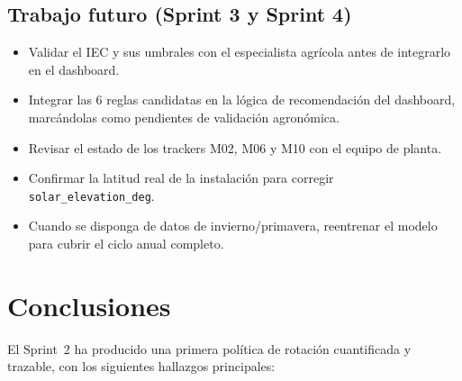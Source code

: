 \documentclass[12pt,a4paper]{article}
\begin{document}
\subsection{Trabajo futuro (Sprint 3 y Sprint 4)}

\begin{itemize}[noitemsep]
    \item Validar el IEC y sus umbrales con el especialista agrícola antes de integrarlo
        en el dashboard.
    \item Integrar las 6 reglas candidatas en la lógica de recomendación del dashboard,
        marcándolas como pendientes de validación agronómica.
    \item Revisar el estado de los trackers M02, M06 y M10 con el equipo de planta.
    \item Confirmar la latitud real de la instalación para corregir \texttt{solar\_elevation\_deg}.
    \item Cuando se disponga de datos de invierno/primavera, reentrenar el modelo para
        cubrir el ciclo anual completo.
\end{itemize}

\section{Conclusiones}

El Sprint~2 ha producido una primera política de rotación cuantificada y trazable,
con los siguientes hallazgos principales:
\end{document}
